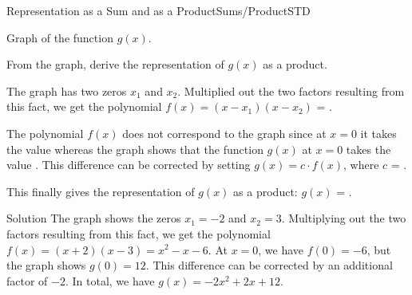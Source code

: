\begin{MXContent}{Representation as a Sum and as a Product}{Sums/Product}{STD}
\begin{MExercise}
\begin{center}
\par
Graph of the function $g(x)$.
\end{center}
From the graph, derive the representation of $g(x)$ as a product.

\begin{MExerciseItems}
\item{The graph has two zeros $x_1$ and $x_2$. Multiplied out the two factors resulting from this fact, we get the polynomial 
$f(x)=(x-x_1)(x-x_2)$ = .}
\item{The polynomial $f(x)$ does not correspond to the graph since at $x=0$ it takes the value 
 whereas the graph shows that the function $g(x)$ at $x=0$ takes the value 
. This difference can be corrected by setting $g(x)=c\cdot f(x)$, where 
$c$ = .}
\item{This finally gives the representation of $g(x)$ as a product: $g(x)$ = .}
\end{MExerciseItems}
\begin{MHint}{Solution}
The graph shows the zeros $x_1=-2$ and $x_2=3$. Multiplying out the two factors resulting from this fact, we get the polynomial
$f(x)=(x+2)(x-3)=x^2-x-6$. At $x=0$, we have $f(0)=-6$, but the graph shows $g(0)=12$. 
This difference can be corrected by an additional factor of $-2$. In total, we have $g(x)=-2x^2+2x+12$.
\end{MHint}
\end{MExercise}



\end{MXContent}
